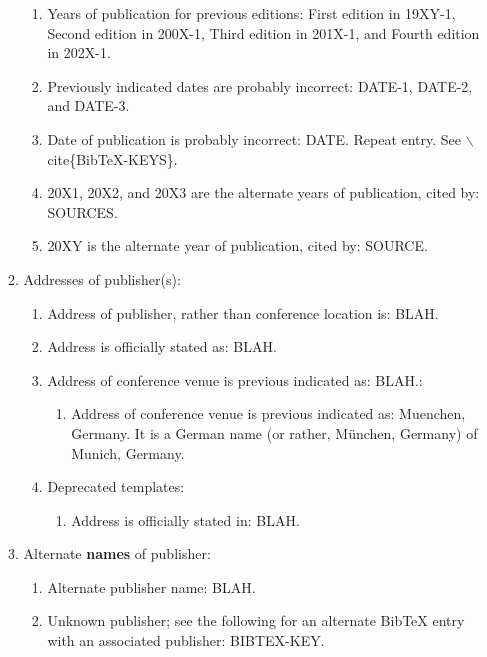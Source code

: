 \documentclass[letter,12pt]{article}
\begin{document}
\begin{enumerate}
\begin{enumerate}
\begin{enumerate}
		\item Years of publication for previous editions: First edition in 19XY-1, Second edition in 200X-1, Third edition in 201X-1, and Fourth edition in 202X-1.
		\item Previously indicated dates are probably incorrect: DATE-1, DATE-2, and DATE-3.
		\item Date of publication is probably incorrect: DATE. Repeat entry. See $\backslash$cite\{BibTeX-KEYS\}.
		\item 20X1, 20X2, and 20X3 are the alternate years of publication, cited by: SOURCES.
		\item 20XY is the alternate year of publication, cited by: SOURCE.
		\end{enumerate}
	\item Addresses of publisher(s): \vspace{-0.2cm}
		\begin{enumerate} \itemsep -2pt
		\item Address of publisher, rather than conference location is: BLAH.
		\item Address is officially stated as: BLAH.
		\item Address of conference venue is previous indicated as: BLAH.: \vspace{-0.1cm}
			\begin{enumerate} \itemsep -1pt
			\item Address of conference venue is previous indicated as: Muenchen, Germany. It is a German name (or rather, M{\"{u}}nchen, Germany) of Munich, Germany.
			\end{enumerate}
		\item Deprecated templates: \vspace{-0.1cm}
			\begin{enumerate} \itemsep -1pt
			\item Address is officially stated in: BLAH.
			\end{enumerate}
		\end{enumerate}
	\item Alternate {\bf names} of publisher: \vspace{-0.2cm}
		\begin{enumerate} \itemsep -2pt
		\item Alternate publisher name: BLAH.
		\item Unknown publisher; see the following for an alternate BibTeX entry with an associated publisher: BIBTEX-KEY.

\end{enumerate}
\end{enumerate}
\end{enumerate}
\end{document}
